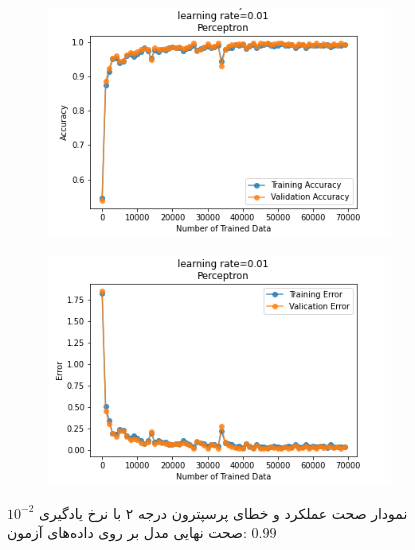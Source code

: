 \documentclass[12pt, a4paper]{article}
\begin{document}
\begin{figure}[h]
    \begin{subfigure}{0.45\linewidth}
        \centering
        \includegraphics[width=\linewidth]{images/6/perceptron/lr/acc_0.01.png}
    \end{subfigure}
    \hfil
    \begin{subfigure}{0.45\linewidth}
        \centering
        \includegraphics[width=\linewidth]{images/6/perceptron/lr/error_0.01.png}
    \end{subfigure}
    \caption{نمودار صحت عملکرد‌ و خطای پرسپترون درجه ۲ با نرخ یادگیری $10^{-2}$
    \newline
    صحت نهایی مدل بر روی داده‌های آزمون: $0.99$}
\end{figure}
\end{document}
